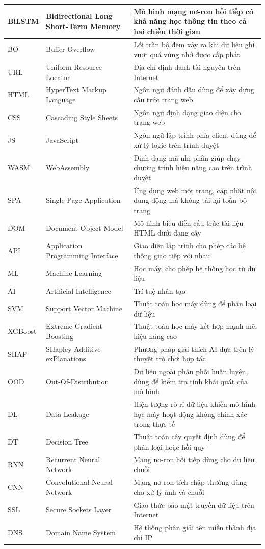 \begin{longtable}{|p{2cm}|p{5.5cm}|p{6.5cm}|}
BiLSTM & Bidirectional Long Short-Term Memory & Mô hình mạng nơ-ron hồi tiếp có khả năng học thông tin theo cả hai chiều thời gian \\ \hline
BO & Buffer Overflow & Lỗi tràn bộ đệm xảy ra khi dữ liệu ghi vượt quá vùng nhớ được cấp phát \\ \hline
URL & Uniform Resource Locator & Địa chỉ định danh tài nguyên trên Internet \\ \hline
HTML & HyperText Markup Language & Ngôn ngữ đánh dấu dùng để xây dựng cấu trúc trang web \\ \hline
CSS & Cascading Style Sheets & Ngôn ngữ định dạng giao diện cho trang web \\ \hline
JS & JavaScript & Ngôn ngữ lập trình phía client dùng để xử lý logic trên trình duyệt \\ \hline
WASM & WebAssembly & Định dạng mã nhị phân giúp chạy chương trình hiệu năng cao trên trình duyệt \\ \hline
SPA & Single Page Application & Ứng dụng web một trang, cập nhật nội dung động mà không tải lại toàn bộ trang \\ \hline
DOM & Document Object Model & Mô hình biểu diễn cấu trúc tài liệu HTML dưới dạng cây \\ \hline
API & Application Programming Interface & Giao diện lập trình cho phép các hệ thống giao tiếp với nhau \\ \hline
ML & Machine Learning & Học máy, cho phép hệ thống học từ dữ liệu \\ \hline
AI & Artificial Intelligence & Trí tuệ nhân tạo \\ \hline
SVM & Support Vector Machine & Thuật toán học máy dùng để phân loại dữ liệu \\ \hline
XGBoost & Extreme Gradient Boosting & Thuật toán học máy kết hợp mạnh mẽ, hiệu năng cao \\ \hline
SHAP & SHapley Additive exPlanations & Phương pháp giải thích AI dựa trên lý thuyết trò chơi hợp tác \\ \hline
OOD & Out-Of-Distribution & Dữ liệu ngoài phân phối huấn luyện, dùng để kiểm tra tính khái quát của mô hình \\ \hline
DL & Data Leakage & Hiện tượng rò rỉ dữ liệu khiến mô hình học máy hoạt động không chính xác trong thực tế \\ \hline
DT & Decision Tree & Thuật toán cây quyết định dùng để phân loại hoặc hồi quy \\ \hline
RNN & Recurrent Neural Network & Mạng nơ-ron hồi tiếp dùng cho dữ liệu chuỗi \\ \hline
CNN & Convolutional Neural Network & Mạng nơ-ron tích chập thường dùng cho xử lý ảnh và chuỗi \\ \hline
SSL & Secure Sockets Layer & Giao thức bảo mật truyền dữ liệu trên Internet \\ \hline
DNS & Domain Name System & Hệ thống phân giải tên miền thành địa chỉ IP \\ \hline
\end{longtable}